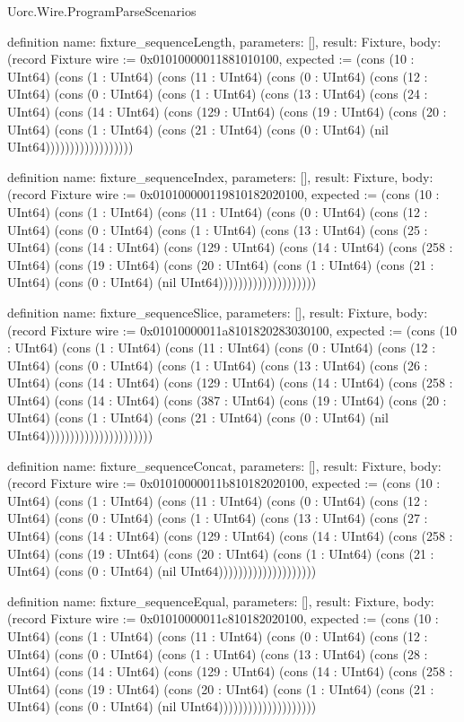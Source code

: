 \begin{lexlean}{Uorc.Wire.ProgramParseScenarios}
\begin{semanticmodule}
definition{
  name: fixture_sequenceLength,
  parameters: [],
  result: Fixture,
  body: (record Fixture {wire := 0x01010000011881010100, expected := (cons (10 : UInt64) (cons (1 : UInt64) (cons (11 : UInt64) (cons (0 : UInt64) (cons (12 : UInt64) (cons (0 : UInt64) (cons (1 : UInt64) (cons (13 : UInt64) (cons (24 : UInt64) (cons (14 : UInt64) (cons (129 : UInt64) (cons (19 : UInt64) (cons (20 : UInt64) (cons (1 : UInt64) (cons (21 : UInt64) (cons (0 : UInt64) (nil UInt64)))))))))))))))))})
}

definition{
  name: fixture_sequenceIndex,
  parameters: [],
  result: Fixture,
  body: (record Fixture {wire := 0x010100000119810182020100, expected := (cons (10 : UInt64) (cons (1 : UInt64) (cons (11 : UInt64) (cons (0 : UInt64) (cons (12 : UInt64) (cons (0 : UInt64) (cons (1 : UInt64) (cons (13 : UInt64) (cons (25 : UInt64) (cons (14 : UInt64) (cons (129 : UInt64) (cons (14 : UInt64) (cons (258 : UInt64) (cons (19 : UInt64) (cons (20 : UInt64) (cons (1 : UInt64) (cons (21 : UInt64) (cons (0 : UInt64) (nil UInt64)))))))))))))))))))})
}

definition{
  name: fixture_sequenceSlice,
  parameters: [],
  result: Fixture,
  body: (record Fixture {wire := 0x01010000011a8101820283030100, expected := (cons (10 : UInt64) (cons (1 : UInt64) (cons (11 : UInt64) (cons (0 : UInt64) (cons (12 : UInt64) (cons (0 : UInt64) (cons (1 : UInt64) (cons (13 : UInt64) (cons (26 : UInt64) (cons (14 : UInt64) (cons (129 : UInt64) (cons (14 : UInt64) (cons (258 : UInt64) (cons (14 : UInt64) (cons (387 : UInt64) (cons (19 : UInt64) (cons (20 : UInt64) (cons (1 : UInt64) (cons (21 : UInt64) (cons (0 : UInt64) (nil UInt64)))))))))))))))))))))})
}

definition{
  name: fixture_sequenceConcat,
  parameters: [],
  result: Fixture,
  body: (record Fixture {wire := 0x01010000011b810182020100, expected := (cons (10 : UInt64) (cons (1 : UInt64) (cons (11 : UInt64) (cons (0 : UInt64) (cons (12 : UInt64) (cons (0 : UInt64) (cons (1 : UInt64) (cons (13 : UInt64) (cons (27 : UInt64) (cons (14 : UInt64) (cons (129 : UInt64) (cons (14 : UInt64) (cons (258 : UInt64) (cons (19 : UInt64) (cons (20 : UInt64) (cons (1 : UInt64) (cons (21 : UInt64) (cons (0 : UInt64) (nil UInt64)))))))))))))))))))})
}

definition{
  name: fixture_sequenceEqual,
  parameters: [],
  result: Fixture,
  body: (record Fixture {wire := 0x01010000011c810182020100, expected := (cons (10 : UInt64) (cons (1 : UInt64) (cons (11 : UInt64) (cons (0 : UInt64) (cons (12 : UInt64) (cons (0 : UInt64) (cons (1 : UInt64) (cons (13 : UInt64) (cons (28 : UInt64) (cons (14 : UInt64) (cons (129 : UInt64) (cons (14 : UInt64) (cons (258 : UInt64) (cons (19 : UInt64) (cons (20 : UInt64) (cons (1 : UInt64) (cons (21 : UInt64) (cons (0 : UInt64) (nil UInt64)))))))))))))))))))})
}


\end{semanticmodule}
\end{lexlean}
